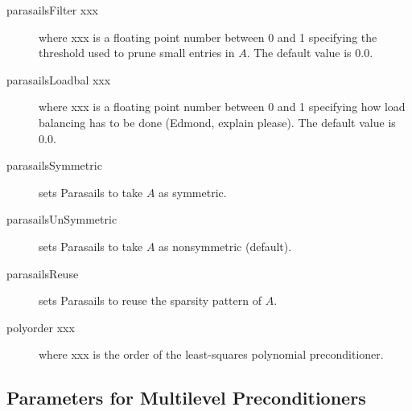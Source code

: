\begin{description}
\item[parasailsFilter xxx] where xxx is a floating point number between 0 
           and 1 specifying the threshold used to prune small entries
           in $A$.  The default value is 0.0.
\item[parasailsLoadbal xxx] where xxx is a floating point number between 0 
           and 1 specifying how load balancing has to be done 
           (Edmond, explain please).  The default value is 0.0.
\item[parasailsSymmetric] sets Parasails to take $A$ as symmetric.
\item[parasailsUnSymmetric] sets Parasails to take $A$ as nonsymmetric
                            (default).
\item[parasailsReuse] sets Parasails to reuse the sparsity pattern of $A$.
\item[polyorder xxx] where xxx is the order of the least-squares polynomial 
           preconditioner.
\end{description}

\subsection{Parameters for Multilevel Preconditioners}

